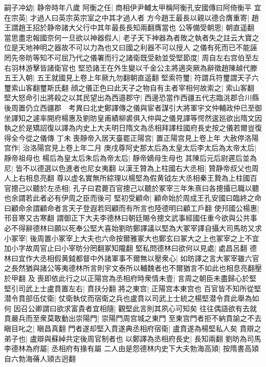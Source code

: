 嗣子冲幼|{
	静帝時年八歲}
阿衡之任|{
	商相伊尹輔太甲稱阿衡孔安國傳曰阿倚衡平}
宜在宗英|{
	才過人曰英宗英宗室之中其才過人者}
方今趙王最長以親以德合膺重寄|{
	趙王謂趙王招於静帝諸大父行中其年最長長知兩翻膺當也}
公等備受朝恩|{
	朝直遥翻}
當思盡忠報國奈何一旦欲以神器假人|{
	老子天下神器為者敗之執者失之註云大寶之位是天地神明之器故不可以力為也又曰國之利器不可以授人}
之儀有死而已不能誣罔先帝昉等知不可屈乃代之儀署而行之諸衛既受勑並受堅節度|{
	周自左右宫伯至左右羽林游擊皆諸衛官也}
堅恐諸王在外生變以千金公主將適突厥為辭徵趙陳越代滕五王入朝|{
	五王就國見上卷上年厥九勿翻朝直遥翻}
堅索符璽|{
	符謂兵符璽謂天子六璽索山客翻璽斯氏翻}
顔之儀正色曰此天子之物自有主者宰相何故索之|{
	索山客翻}
堅大怒命引出將殺之以其民望出為西邉郡守|{
	西邊恐當作西疆五代志臨洮郡合川縣後周置仍立西疆郡　考異曰北史鄭譯傳之儀與宦者謀引大將軍宇文仲輔政仲已至御坐譯知之遽率開府楊惠及劉昉皇甫績柳裘俱入仲與之儀見譯等愕然逡廵欲出隋文因執之於是矯詔復以譯為内史上大夫明日隋文為丞相拜譯柱國府長史按之儀若爾豈復得全今從之儀傳}
丁未喪靜帝入居天臺罷正陽宫|{
	置正陽宫見上卷上年}
大赦停洛陽宫作|{
	治洛陽宫見上卷上年二月}
庚戌尊阿史那太后為太皇太后李太后為太帝太后|{
	靜帝祖母也}
楊后為皇太后朱后為帝太后|{
	靜帝嫡母生母也}
其陳后元后尉遲后並為尼|{
	皆不以德選以色進者也尼女夷翻}
以漢王贊為上柱國右大丞相|{
	贊静帝叔父也周人上右相息亮翻}
尊以虚名實無所綜理以楊堅為假黄钺左大丞相秦王贄為上柱國百官摠己以聽於左丞相|{
	孔子曰君薨百官摠己以聽於冢宰三年朱熹曰各摠攝已職以聽也余謂若此者必有伊周之臣而後可}
堅初受顧命|{
	顧命始於周成王孔安國曰臨終之命曰顧命余謂顧命者言天子登遐若囘顧而有所言也陸德明曰顧工戶翻}
使䢴國公楊惠|{
	邗音寒又古寒翻}
謂御正下大夫李德林曰朝廷賜令摠文武事經國任重今欲與公共事必不得辭德林曰願以死奉公堅大喜始劉昉鄭譯議以堅為大冢宰譯自攝大司馬昉又求小冢宰|{
	後周置小冢宰上大夫也六命按爾雅冢大也鄭玄曰冢大之上也冢宰之上不宜加小字故周官止曰小宰昉分罔翻冢知隴翻}
堅私問德林曰欲何以見處|{
	處昌呂翻}
德林曰宜作大丞相假黄鉞都督中外諸軍事不爾無以壓衆心|{
	如昉譯之言大冢宰雖六官之長然猶與諸公等夷德林所言則宇文泰所以輔魏者也不爾猶言不如此也相息亮翻壓於甲翻}
及喪即依此行之以正陽宫為丞相府時衆情未壹|{
	言周之朝臣未盡歸心於堅}
堅引司武上士盧賁置左右|{
	賁扶分翻}
將之東宫|{
	正陽宫本東宫也}
百官皆不知所從堅潜令賁部伍仗衛|{
	仗衛執仗而宿衛之兵也盧賁以司武上士統之楊堅潜令賁此舉為如何}
因召公卿謂曰欲求富貴者宜相隨|{
	觀堅此言則其夙心可知矣}
往往偶語欲有去就賁嚴兵而至衆莫敢動出崇陽門|{
	崇陽門周宫城之東門}
至東宫門者拒不納賁諭之不去瞋目叱之|{
	瞋昌真翻}
門者遂却堅入賁遂典丞相府宿衛|{
	盧賁遂為楊堅私人矣}
賁辯之弟子也|{
	盧辯與蘇綽共定後周官制者也}
以鄭譯為丞相府長史|{
	長知兩翻}
劉昉為司馬李德林為府屬|{
	丞相府有掾有屬}
二人由是怨德林内史下大夫勃海高熲|{
	按隋書高熲自六勃海蓨人熲古迥翻}
